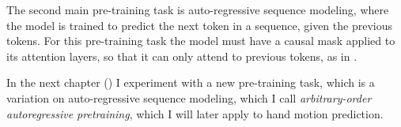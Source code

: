 The second main pre-training task is auto-regressive sequence modeling, where the model is trained to predict the next token in a sequence, given the previous tokens. For this pre-training task the model must have a causal mask applied to its attention layers, so that it can only attend to previous tokens, as in .

In the next chapter () I experiment with a new pre-training task, which is a variation on auto-regressive sequence modeling, which I call \textit{arbitrary-order autoregressive pretraining}, which I will later apply to hand motion prediction.
